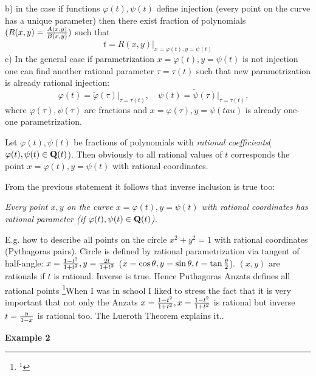     b) in the case if functions $\varphi(t),\psi(t)$ define injection
     (every point on the curve has a unique parameter)
     then there exist fraction of polynomials  $(R(x,y)={A(x,y)\over B(x,y)})$
     such that
                                    $$
                         t=R(x,y)\big\vert_{x=\varphi(t), y=\psi(t)}
                                    $$
     c) In the general case if parametrization $x=\varphi(t), y=\psi(t)$ is not
     injection one can find another rational parameter $\tau=\tau(t)$
     such that new parametrization is already rational injection:
                                   $$
                  \varphi(t)=\tilde\varphi(\tau)\big\vert_{\tau=\tau(t)},\quad
                  \psi(t)=\tilde\psi(\tau)\big\vert_{\tau=\tau(t)},\quad
                                     $$
     where  $\varphi(\tau),\psi(\tau)$ are fractions and
           $x=\varphi(\tau), y=\psi(tau)$ is already one-one parametrization.





     Let $\varphi(t),\psi(t)$ be fractions of polynomials with
     {\it rational coefficients}($\varphi(t),\psi(t)\in{\bf Q}(t)$).
     Then obviously to all rational values of $t$
     corresponds the point $x=\varphi(t), y=\psi(t)$ with rational coordinates.

     From the previous statement it follows that inverse inclusion is true too:

     {\it Every point $x,y$ on the curve $x=\varphi(t), y=\psi(t)$
     with rational coordinates has rational parameter
     (if $\varphi(t),\psi(t)\in{\bf Q}(t)$).}

     E.g. how to describe all points on the circle $x^2+y^2=1$
          with rational coordinates (Pythagoras pairs).
          Circle is defined by rational parametrization via
          tangent of half-angle: $x={1-t^2\over 1+t^2}, y={2t\over 1+t^2}$
          ($x=\cos\theta, y=\sin\theta, t=\tan {\theta\over 2}$).
           $(x,y)$ are rationals if $t$ is rational. Inverse is true.
           Hence  Puthagoras Anzats defines all rational points
            \footnote{$^1$}{When I was in school I liked
           to stress the fact that it is very important that
           not only the Anzats  $x={1-t^2\over 1+t^2}, x={1-t^2\over 1+t^2}$
           is rational but inverse $t={y\over 1-x}$ is rational too.
           The Lueroth Theorem explains it.}.

\bigskip

   {\bf Example 2}

